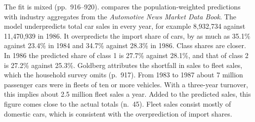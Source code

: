 The fit is mixed (pp.~916--920).  compares the population-weighted predictions with
industry aggregates from the \emph{Automotive News Market Data Book}. The model underpredicts total car sales in
every year, for example 8,932,734 against 11,470,939 in 1986. It overpredicts the import share of cars, by as much
as 35.1\% against 23.4\% in 1984 and 34.7\% against 28.3\% in 1986. Class shares are closer. In 1986 the
predicted share of class 1 is 27.7\% against 28.1\%, and that of class 2 is 27.2\% against 25.3\%. Goldberg
attributes the shortfall in sales to fleet sales, which the household survey omits (p.~917). From 1983 to 1987
about 7 million passenger cars were in fleets of ten or more vehicles. With a three-year turnover, this implies
about 2.5 million fleet sales a year. Added to the predicted sales, this figure comes close to the actual totals
(n.~45). Fleet sales consist mostly of domestic cars, which is consistent with the overprediction of import
shares.

